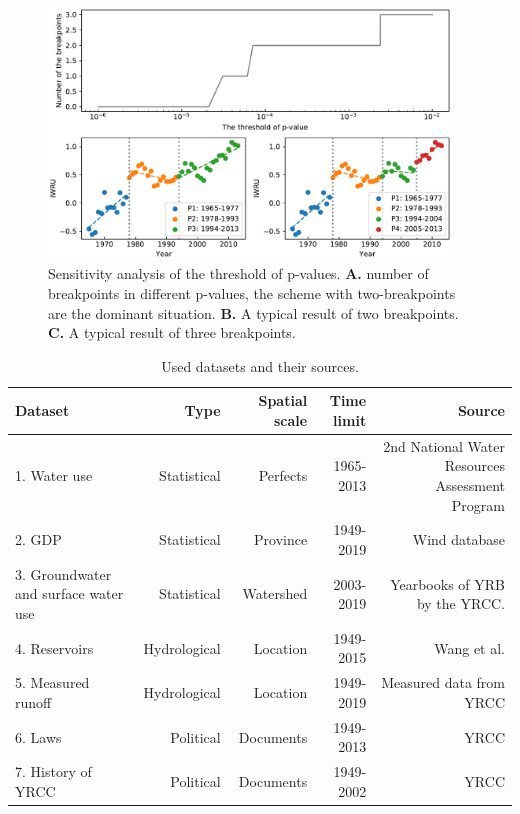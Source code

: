 \documentclass[9pt,twoside,lineno]{pnas-new}
\begin{document}


\begin{figure}
    \centering
    \includegraphics[width=0.95\textwidth]{../../figures/sup/sensitivity.pdf}
    \caption{
        Sensitivity analysis of the threshold of p-values. 
        \textbf{A.} number of breakpoints in different p-values, the scheme with two-breakpoints are the dominant situation.
        \textbf{B.} A typical result of two breakpoints.
        \textbf{C.} A typical result of three breakpoints.
    }
\end{figure}


\begin{table}\centering
    \caption{Used datasets and their sources.}
    
    \begin{tabular}{lrrrr}
    Dataset & Type & Spatial scale & Time limit & Source \\
    \midrule
    1. Water use & Statistical & Perfects & 1965-2013 & 2nd National Water Resources Assessment Program \\
    2. GDP & Statistical & Province & 1949-2019 & Wind database \\
    3. Groundwater and surface water use & Statistical & Watershed & 2003-2019 & Yearbooks of YRB by the YRCC. \\
    4. Reservoirs & Hydrological & Location & 1949-2015 & Wang et al. \cite{wangYellowRiverWater2019} \\
    5. Measured runoff & Hydrological & Location & 1949-2019 & Measured data from YRCC \\
    6. Laws & Political & Documents & 1949-2013 & YRCC \cite{yellowriverconservancycommissionYellowRiverBasin2013} \\
    7. History of YRCC & Political & Documents & 1949-2002 & YRCC \cite{ yellowriverarchivesOrganizationalHistoryYellow2004} \\
    \bottomrule
    \end{tabular}
\end{table}
\end{document}
